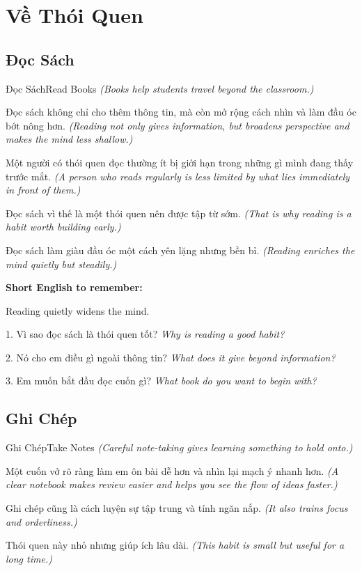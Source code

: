 \chapter{Về Thói Quen}

\section{Đọc Sách}
\begin{truyen}{Đọc Sách}{Read Books}
\textit{(Books help students travel beyond the classroom.)}

Đọc sách không chỉ cho thêm thông tin, mà còn mở rộng cách nhìn và làm đầu óc bớt nông hơn.
\textit{(Reading not only gives information, but broadens perspective and makes the mind less shallow.)}

Một người có thói quen đọc thường ít bị giới hạn trong những gì mình đang thấy trước mắt.
\textit{(A person who reads regularly is less limited by what lies immediately in front of them.)}

Đọc sách vì thế là một thói quen nên được tập từ sớm.
\textit{(That is why reading is a habit worth building early.)}
\end{truyen}

\begin{baihoc}
Đọc sách làm giàu đầu óc một cách yên lặng nhưng bền bỉ.
\textit{(Reading enriches the mind quietly but steadily.)}
\end{baihoc}

\begin{ghinhoanh}
\textbf{Short English to remember:}

Reading quietly widens the mind.

\end{ghinhoanh}

\begin{tuhocnhanh}
1. Vì sao đọc sách là thói quen tốt? \textit{Why is reading a good habit?}

2. Nó cho em điều gì ngoài thông tin? \textit{What does it give beyond information?}

3. Em muốn bắt đầu đọc cuốn gì? \textit{What book do you want to begin with?}
\end{tuhocnhanh}
\ngancach

\section{Ghi Chép}
\begin{truyen}{Ghi Chép}{Take Notes}
\textit{(Careful note-taking gives learning something to hold onto.)}

Một cuốn vở rõ ràng làm em ôn bài dễ hơn và nhìn lại mạch ý nhanh hơn.
\textit{(A clear notebook makes review easier and helps you see the flow of ideas faster.)}

Ghi chép cũng là cách luyện sự tập trung và tính ngăn nắp.
\textit{(It also trains focus and orderliness.)}

Thói quen này nhỏ nhưng giúp ích lâu dài.
\textit{(This habit is small but useful for a long time.)}
\end{truyen}

